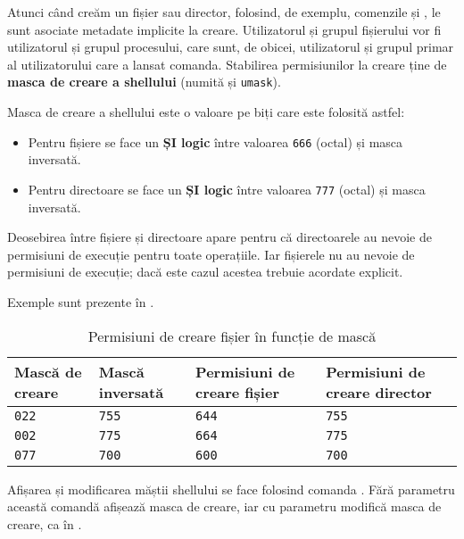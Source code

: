 Atunci când creăm un fișier sau director, folosind, de exemplu, comenzile 
și , le sunt asociate metadate implicite la creare. Utilizatorul și grupul
fișierului vor fi utilizatorul și grupul procesului, care sunt, de obicei,
utilizatorul și grupul primar al utilizatorului care a lansat comanda.
Stabilirea permisiunilor la creare ține de \textbf{masca de creare a shellului} (numită și \texttt{umask}).

Masca de creare a shellului este o valoare pe biți care este folosită astfel:

\begin{itemize}
  \item Pentru fișiere se face un \textbf{ȘI logic} între valoarea \texttt{666} (octal) și
		masca inversată.
  \item Pentru directoare se face un \textbf{ȘI logic} între valoarea \texttt{777} (octal)
		și masca inversată.
\end{itemize}

Deosebirea între fișiere și directoare apare pentru că directoarele au nevoie de permisiuni de execuție pentru
toate operațiile. Iar fișierele nu au nevoie de permisiuni de execuție; dacă
este cazul acestea trebuie acordate explicit.

Exemple sunt prezente în .

\begin{table}[!htb]
\caption{Permisiuni de creare fișier în funcție de mască}
\begin{center}
  \begin{tabular}{ p{} p{} p{} p{} }
	\toprule
                \textbf{Mască de creare} & \textbf{Mască inversată} & \textbf{Permisiuni de creare fișier} & \textbf{Permisiuni de creare director} \\
	\midrule
                \texttt{022} & \texttt{755} & \texttt{644} & \texttt{755} \\
	\midrule
                \texttt{002} & \texttt{775} & \texttt{664} & \texttt{775} \\
	\midrule
                \texttt{077} & \texttt{700} & \texttt{600} & \texttt{700} \\
	\bottomrule
	\end{tabular}
        \label{table:user:umask}
\end{center}
\end{table}

Afișarea și modificarea măștii shellului se face folosind comanda . Fără
parametru această comandă afișează masca de creare, iar cu parametru modifică
masca de creare, ca în .

